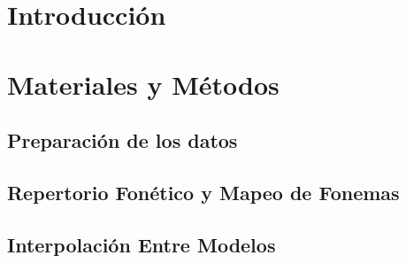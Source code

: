 \documentclass[11pt,a4paper,twoside]{tesis}
\begin{document}

\def\autor{Franco Negri}
\def\tituloTesis{Implementación y evaluación de un sistema de síntesis de habla con acento extranjero variable}
\def\runtitle{Implementacíón y evaluación de un sistema de sintesis de habla}
\def\director{Agustín Gravano}
\def\lugar{Buenos Aires, 2018}


\frontmatter

\pagestyle{empty}
%
\cleardoublepage
\cleardoublepage

\cleardoublepage
\tableofcontents

\mainmatter
\pagestyle{headings}

%
\chapter{Introducción}

\chapter{Materiales y Métodos}

\section{Preparación de los datos}\label{dataPrepartion}


\section{Repertorio Fonético y Mapeo de Fonemas}\label{phoneMaping}


\section{Interpolación Entre Modelos}\label{modelInterpolation}

\end{document}

